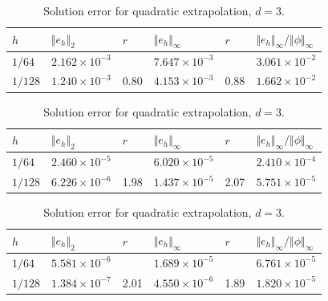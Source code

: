 \begin{table}[htb]
  \begin{center}
    \begin{tabular}{llllll}
      \hline
      $h$ & $\Vert e_h \Vert_2$ & $r$ & $\Vert e_h
      \Vert_\infty$ & $r$ & $\Vert e_h \Vert_\infty /
      \Vert \phi \Vert_\infty$ \\ [0.2ex] \hline 
      \vphantom{\rule{0pt}{2.7ex}}
      $1/64$  & $2.162 \times 10^{-3}$ & & $7.647 \times 10^{-3}$ & &
      $3.061 \times 10^{-2}$ \\ 
      $1/128$ & $1.240 \times 10^{-3}$ & 0.80 & $4.153 \times 10^{-3}$ &
      0.88 & $1.662 \times 10^{-2}$ \\ [0.2ex]
      \hline
    \end{tabular}
    \caption{Solution error for constant extrapolation, $d=3$.}
    \label{tbl:rel_error_const}
  \end{center}

  \begin{center}
    \begin{tabular}{llllll}
      \hline
      $h$ & $\Vert e_h \Vert_2$ & $r$ & $\Vert e_h
      \Vert_\infty$ & $r$ & $\Vert e_h \Vert_\infty /
      \Vert \phi \Vert_\infty$\\ [0.2ex]
      \hline 
      \vphantom{\rule{0pt}{2.7ex}}
      $1/64$  & $2.460 \times 10^{-5}$ & & $6.020 \times 10^{-5}$ & &
      $2.410 \times 10^{-4}$ \\
      $1/128$ & $6.226 \times 10^{-6}$ & 1.98 & $1.437 \times 10^{-5}$ &
      2.07 & $5.751 \times 10^{-5}$ \\ [0.2ex]
      \hline
    \end{tabular}
    \caption{Solution error for linear extrapolation, $d=3$.}
    \label{tbl:rel_error_lin}
  \end{center}

  \begin{center}
    \begin{tabular}{llllll}
      \hline
      $h$ & $\Vert e_h \Vert_2$ & $r$ & $\Vert e_h
      \Vert_\infty$ & $r$ & $\Vert e_h \Vert_\infty /
      \Vert \phi \Vert_\infty$\\ [0.2ex]
      \hline 
      \vphantom{\rule{0pt}{2.7ex}}
      $1/64$  & $5.581 \times 10^{-6}$ & & $1.689 \times 10^{-5}$ & &
      $6.761 \times 10^{-5}$ \\ 
      $1/128$ & $1.384 \times 10^{-7}$ & 2.01 & $4.550 \times 10^{-6}$ &
      1.89 & $1.820 \times 10^{-5}$ \\ [0.2ex]
      \hline
    \end{tabular}
    \caption{Solution error for quadratic extrapolation, $d=3$.}
    \label{tbl:rel_error_quad}
  \end{center}
\end{table}


